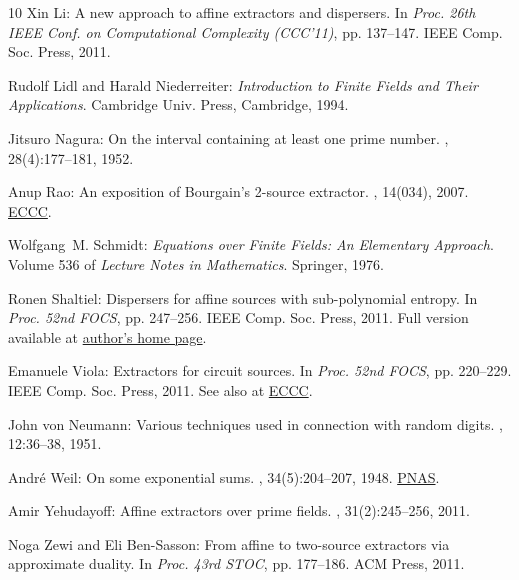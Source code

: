 \begin{thebibliography}{10}
{\sc Xin Li}: A new approach to affine extractors and dispersers.
\newblock In {\em Proc. 26th IEEE Conf. on Computational Complexity (CCC'11)},
  pp. 137--147. IEEE Comp. Soc. Press, 2011.

{\sc Rudolf Lidl and Harald Niederreiter}: {\em Introduction to Finite Fields
  and Their Applications}.
\newblock Cambridge Univ. Press, Cambridge, 1994.

{\sc Jitsuro Nagura}: On the interval containing at least one prime number.
, 28(4):177--181, 1952.

{\sc Anup Rao}: An exposition of {B}ourgain's 2-source extractor.
, 14(034), 2007.
\newblock \href{http://eccc.hpi-web.de/report/2007/034/}{ECCC}.

{\sc Wolfgang~M. Schmidt}: {\em Equations over Finite Fields: An Elementary
  Approach}.
\newblock Volume 536 of {\em Lecture Notes in Mathematics}.
\newblock Springer, 1976.

{\sc Ronen Shaltiel}: Dispersers for affine sources with sub-polynomial
  entropy.
\newblock In {\em Proc. 52nd FOCS}, pp. 247--256. IEEE Comp. Soc. Press, 2011.
\newblock Full version available at
  \href{http://cs.haifa.ac.il/~ronen/online_papers/online_papers.html}{author's
  home page}.

{\sc Emanuele Viola}: Extractors for circuit sources.
\newblock In {\em Proc. 52nd FOCS}, pp. 220--229. IEEE Comp. Soc. Press, 2011.
\newblock See also at \href{http://eccc.hpi-web.de/report/2011/056/}{ECCC}.

{\sc John von Neumann}: Various techniques used in connection with random
  digits.
, 12:36--38, 1951.

{\sc Andr{\'e} Weil}: On some exponential sums.
, 34(5):204--207, 1948.
\newblock \href{https://www.ncbi.nlm.nih.gov/pmc/articles/PMC1079093/}{PNAS}.

{\sc Amir Yehudayoff}: Affine extractors over prime fields.
, 31(2):245--256, 2011.
\newblock [\epfmtdoi{10.1007/s00493-011-2604-9}]

{\sc Noga Zewi and Eli {Ben-Sasson}}: From affine to two-source extractors via
  approximate duality.
\newblock In {\em Proc. 43rd STOC}, pp. 177--186. ACM Press, 2011.
\newblock [\epfmtdoi{10.1145/1993636.1993661}]

\end{thebibliography}

